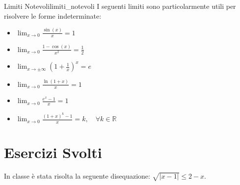 \documentclass{article}
\begin{document}
\begin{theorem}{Limiti Notevoli}{limiti_notevoli}
    I seguenti limiti sono particolarmente utili per risolvere le forme indeterminate:
    \begin{itemize}
        \item $\lim_{x \to 0} \frac{\sin(x)}{x} = 1$
        \item $\lim_{x \to 0} \frac{1 - \cos(x)}{x^2} = \frac{1}{2}$
        \item $\lim_{x \to \pm\infty} \left(1 + \frac{1}{x}\right)^x = e$
        \item $\lim_{x \to 0} \frac{\ln(1+x)}{x} = 1$
        \item $\lim_{x \to 0} \frac{e^x - 1}{x} = 1$
        \item $\lim_{x \to 0} \frac{(1+x)^k - 1}{x} = k, \quad \forall k \in \mathbb{R}$
    \end{itemize}
\end{theorem}

\section{Esercizi Svolti}
In classe è stata risolta la seguente disequazione: $ \sqrt{|x-1|} \le 2-x $.
\end{document}
